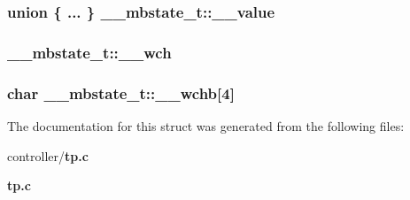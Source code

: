 \subsubsection[{\_\-\_\-value}]{\setlength{\rightskip}{0pt plus 5cm}union \{ ... \}   {\bf \_\-\_\-mbstate\_\-t::\_\-\_\-value}}\label{struct____mbstate__t_a6c458980b7ca50a7ae57b08744a4cd0a}
\subsubsection[{\_\-\_\-wch}]{ {\bf \_\-\_\-mbstate\_\-t::\_\-\_\-wch}}\label{struct____mbstate__t_a81585f4a2824cbcd93141fb676a9202c}
\subsubsection[{\_\-\_\-wchb}]{\setlength{\rightskip}{0pt plus 5cm}char {\bf \_\-\_\-mbstate\_\-t::\_\-\_\-wchb}[4]}\label{struct____mbstate__t_a2c9631f54d97686f7c3715b6c44bd5f3}


The documentation for this struct was generated from the following files:\begin{DoxyCompactItemize}
\item 
controller/{\bf tp.c}\item 
{\bf tp.c}\end{DoxyCompactItemize}
